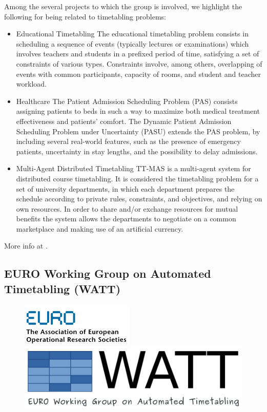 Among the several projects to which the group is involved, we highlight the following for being related to timetabling problems:
\begin{itemize}
\item Educational Timetabling
The educational timetabling problem consists in scheduling a sequence of events (typically lectures or examinations) which involves teachers and students in a prefixed period of time, satisfying a set of constraints of various types. Constraints involve, among others, overlapping of events with common participants, capacity of rooms, and student and teacher workload.
\item Healthcare
The Patient Admission Scheduling Problem (PAS) consists assigning patients to beds in such a way to maximize both medical treatment effectiveness and patients' comfort. The Dynamic Patient Admission Scheduling Problem under Uncertainty (PASU) extends the PAS problem, by including several real-world features, such as the presence of emergency patients, uncertainty in stay lengths, and the possibility to delay admissions.
\item Multi-Agent Distributed Timetabling
TT-MAS is a multi-agent system for distributed course timetabling. It is considered the timetabling problem for a set of university departments, in which each department prepares the schedule according to private rules, constraints, and objectives, and relying on own resources. In order to share and/or exchange resources for mutual benefits the system allows the departments to negotiate on a common marketplace and making use of an artificial currency.
\end{itemize}

More info at \cite{UdineSATT}.


\subsection{EURO Working Group on Automated Timetabling (WATT)}
\label{watt}

\begin{figure}[h]
\hfill\includegraphics[scale=0.7]{figures/euro.png}
\hfill\includegraphics[scale=0.35]{figures/watt.png}
\end{figure}

